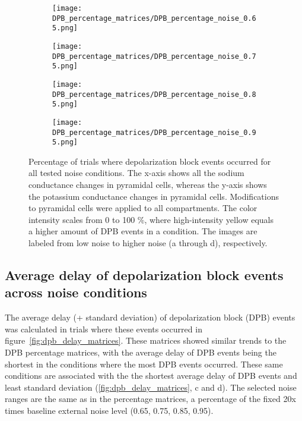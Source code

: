 \begin{figure}[htbp]
    \centering
    \begin{subfigure}{0.48\textwidth}
        \texttt{[image: DPB\_percentage\_matrices/DPB\_percentage\_noise\_0.65.png]}
        \caption{} %
    \end{subfigure}\hfill
    \begin{subfigure}{0.48\textwidth}
        \texttt{[image: DPB\_percentage\_matrices/DPB\_percentage\_noise\_0.75.png]}
        \caption{} %
    \end{subfigure}

    \bigskip %

    \begin{subfigure}{0.48\textwidth}
        \texttt{[image: DPB\_percentage\_matrices/DPB\_percentage\_noise\_0.85.png]}
        \caption{} %
    \end{subfigure}\hfill
    \begin{subfigure}{0.48\textwidth}
        \texttt{[image: DPB\_percentage\_matrices/DPB\_percentage\_noise\_0.95.png]}
        \caption{} %
    \end{subfigure}

    \caption[DPB percentage matrices]{Percentage of trials where depolarization block events occurred for all tested noise conditions.
        The x-axis shows all the sodium conductance changes in pyramidal cells, whereas the y-axis shows the potassium conductance changes in pyramidal cells.
        Modifications to pyramidal cells were applied to all compartments.
        The color intensity scales from 0 to 100 \%, where high-intensity yellow equals a higher amount of DPB events in a condition.
        The images are labeled from low noise to higher noise (a through d), respectively.}\label{fig:dpb_percentage_matrices}
\end{figure}

\subsection{Average delay of depolarization block events across noise conditions}
The average delay (+ standard deviation) of depolarization block (DPB) events was calculated in trials where these events occurred in figure~\ref{fig:dpb_delay_matrices}.
These matrices showed similar trends to the DPB percentage matrices, with the average delay of DPB events being the shortest in the conditions where the most DPB events occurred.
These same conditions are associated with the the shortest average delay of DPB events and least standard deviation (\ref{fig:dpb_delay_matrices}, c and d).
The selected noise ranges are the same as in the percentage matrices, a percentage of the fixed 20x times baseline external noise level (0.65, 0.75, 0.85, 0.95).

